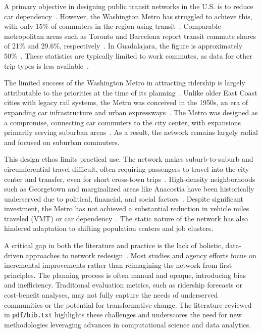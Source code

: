 \documentclass[manuscript]{acmart}
\begin{document}
A primary objective in designing public transit networks in the U.S. is to reduce car dependency~\cite{bib:us_transit_policy}. However, the Washington Metro has struggled to achieve this, with only 15\% of commuters in the region using transit~\cite{bib:commute_stats}. Comparable metropolitan areas such as Toronto and Barcelona report transit commute shares of 21\% and 29.6\%, respectively~\cite{bib:toronto, bib:barcelona}. In Guadalajara, the figure is approximately 50\%~\cite{bib:guadalajara}. These statistics are typically limited to work commutes, as data for other trip types is less available~\cite{bib:commute_stats}.

The limited success of the Washington Metro in attracting ridership is largely attributable to the priorities at the time of its planning~\cite{bib:wmata_history}. Unlike older East Coast cities with legacy rail systems, the Metro was conceived in the 1950s, an era of expanding car infrastructure and urban expressways~\cite{bib:us_highways}. The Metro was designed as a compromise, connecting car commuters to the city center, with expansions primarily serving suburban areas~\cite{bib:wmata_history}. As a result, the network remains largely radial and focused on suburban commuters.

This design ethos limits practical use. The network makes suburb-to-suburb and circumferential travel difficult, often requiring passengers to travel into the city center and transfer, even for short cross-town trips~\cite{bib:bast2016route}. High-density neighborhoods such as Georgetown and marginalized areas like Anacostia have been historically underserved due to political, financial, and social factors~\cite{bib:overview-field}. Despite significant investment, the Metro has not achieved a substantial reduction in vehicle miles traveled (VMT) or car dependency~\cite{bib:wmata-vmt}. The static nature of the network has also hindered adaptation to shifting population centers and job clusters.

A critical gap in both the literature and practice is the lack of holistic, data-driven approaches to network redesign~\cite{bib:camporeale2016equity}. Most studies and agency efforts focus on incremental improvements rather than reimagining the network from first principles. The planning process is often manual and opaque, introducing bias and inefficiency. Traditional evaluation metrics, such as ridership forecasts or cost-benefit analyses, may not fully capture the needs of underserved communities or the potential for transformative change. The literature reviewed in \texttt{pdf/bib.txt} highlights these challenges and underscores the need for new methodologies leveraging advances in computational science and data analytics.
\end{document}
